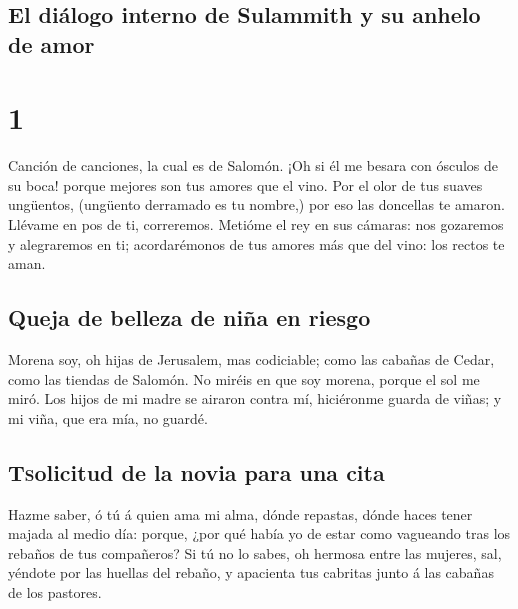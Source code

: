 \hypertarget{el-diuxe1logo-interno-de-sulammith-y-su-anhelo-de-amor}{%
\subsection{El diálogo interno de Sulammith y su anhelo de
amor}\label{el-diuxe1logo-interno-de-sulammith-y-su-anhelo-de-amor}}

\hypertarget{section}{%
\section{1}\label{section}}

 Canción de canciones, la cual es de Salomón.
 ¡Oh si él me besara con ósculos de su boca! porque
mejores son tus amores que el vino.  Por el olor de tus
suaves ungüentos, (ungüento derramado es tu nombre,) por eso las
doncellas te amaron.  Llévame en pos de ti, correremos.
Metióme el rey en sus cámaras: nos gozaremos y alegraremos en ti;
acordarémonos de tus amores más que del vino: los rectos te aman.

\hypertarget{queja-de-belleza-de-niuxf1a-en-riesgo}{%
\subsection{Queja de belleza de niña en
riesgo}\label{queja-de-belleza-de-niuxf1a-en-riesgo}}

 Morena soy, oh hijas de Jerusalem, mas codiciable; como
las cabañas de Cedar, como las tiendas de Salomón.  No
miréis en que soy morena, porque el sol me miró. Los hijos de mi madre
se airaron contra mí, hiciéronme guarda de viñas; y mi viña, que era
mía, no guardé.

\hypertarget{tsolicitud-de-la-novia-para-una-cita}{%
\subsection{\texorpdfstring{\textsc{Ts}olicitud de la novia para una
cita}{Tsolicitud de la novia para una cita}}\label{tsolicitud-de-la-novia-para-una-cita}}

 Hazme saber, ó tú á quien ama mi alma, dónde repastas,
dónde haces tener majada al medio día: porque, ¿por qué había yo de
estar como vagueando tras los rebaños de tus compañeros? 
Si tú no lo sabes, oh hermosa entre las mujeres, sal, yéndote por las
huellas del rebaño, y apacienta tus cabritas junto á las cabañas de los
pastores.

